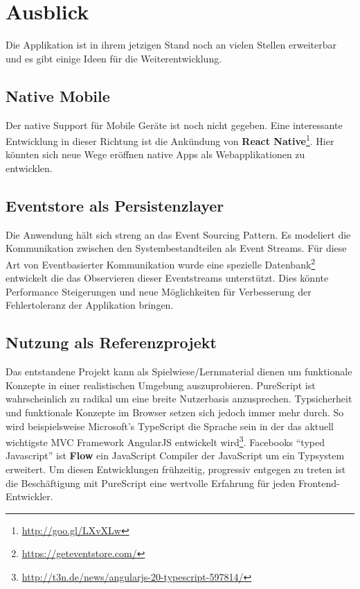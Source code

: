 \section{Ausblick}
Die Applikation ist in ihrem jetzigen Stand noch an vielen Stellen
erweiterbar und es gibt einige Ideen für die Weiterentwicklung.

\subsection{Native Mobile}
Der native Support für Mobile Geräte ist noch nicht gegeben. Eine
interessante Entwicklung in dieser Richtung ist die Ankündung von
\textbf{React Native}\footnote{\url{http://goo.gl/LXvXLw}}.
Hier könnten sich neue Wege eröffnen native Apps als Webapplikationen
zu entwicklen.

\subsection{Eventstore als Persistenzlayer}
Die Anwendung hält sich streng an das \gls{Event Sourcing} Pattern. Es
modeliert die Kommunikation zwischen den Systembestandteilen als Event
Streams. Für diese Art von Eventbasierter Kommunikation wurde eine spezielle
Datenbank\footnote{\url{https://geteventstore.com/}} entwickelt die
das Observieren dieser Eventstreams unterstützt. Dies könnte
Performance Steigerungen und neue Möglichkeiten für Verbesserung der Fehlertoleranz
der Applikation bringen.

\subsection{Nutzung als Referenzprojekt}
Das entstandene Projekt kann als Spielwiese/Lernmaterial dienen um
funktionale Konzepte in einer realistischen Umgebung auszuprobieren.
PureScript ist wahrscheinlich zu radikal um eine breite Nutzerbasis
anzusprechen. Typsicherheit und funktionale Konzepte im Browser setzen
sich jedoch immer mehr durch. So wird beispielsweise Microsoft's
TypeScript die Sprache sein in der das aktuell wichtigste MVC
Framework AngularJS entwickelt wird\footnote{\url{http://t3n.de/news/angularjs-20-typescript-597814/}}.
Facebooks ``typed Javascript'' ist \textbf{Flow} ein JavaScript
Compiler der JavaScript um ein Typsystem erweitert. Um diesen
Entwicklungen frühzeitig, progressiv entgegen zu treten ist die
Beschäftigung mit PureScript eine wertvolle Erfahrung für jeden
Frontend-Entwickler.

